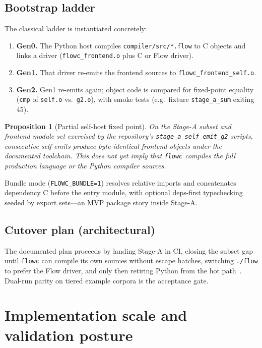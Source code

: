 \documentclass[11pt,a4paper]{article}
\newtheorem{proposition}{Proposition}
\theoremstyle{remark}
\begin{document}
\subsection{Bootstrap ladder}

The classical ladder is instantiated concretely:

\begin{enumerate}[leftmargin=*]
  \item \textbf{Gen0.} The Python host compiles \texttt{compiler/src/*.flow}
        to C objects and links a driver (\texttt{flowc\_frontend.o} plus C or
        Flow driver).
  \item \textbf{Gen1.} That driver re-emits the frontend sources to
        \texttt{flowc\_frontend\_self.o}.
  \item \textbf{Gen2.} Gen1 re-emits again; object code is compared for
        fixed-point equality (\texttt{cmp} of \texttt{self.o} vs.\ \texttt{g2.o}),
        with smoke tests (e.g.\ fixture \texttt{stage\_a\_sum} exiting 45).
\end{enumerate}

\begin{proposition}[Partial self-host fixed point]
On the Stage-A subset and frontend module set exercised by the repository's
\texttt{stage\_a\_self\_emit\_g2} scripts, consecutive self-emits produce
byte-identical frontend objects under the documented toolchain. This does
\emph{not} yet imply that \texttt{flowc} compiles the full production language
or the Python compiler sources.
\end{proposition}

Bundle mode (\texttt{FLOWC\_BUNDLE=1}) resolves relative imports and
concatenates dependency C before the entry module, with optional
deps-first typechecking seeded by export sets---an MVP package story inside
Stage-A.

\subsection{Cutover plan (architectural)}

The documented plan proceeds by landing Stage-A in CI, closing the subset gap
until \texttt{flowc} can compile its own sources without escape hatches,
switching \texttt{./flow} to prefer the Flow driver, and only then retiring
Python from the hot path~\cite{flow-selfhost}. Dual-run parity on tiered example
corpora is the acceptance gate.

\section{Implementation scale and validation posture}
\label{sec:validation}
\end{document}
